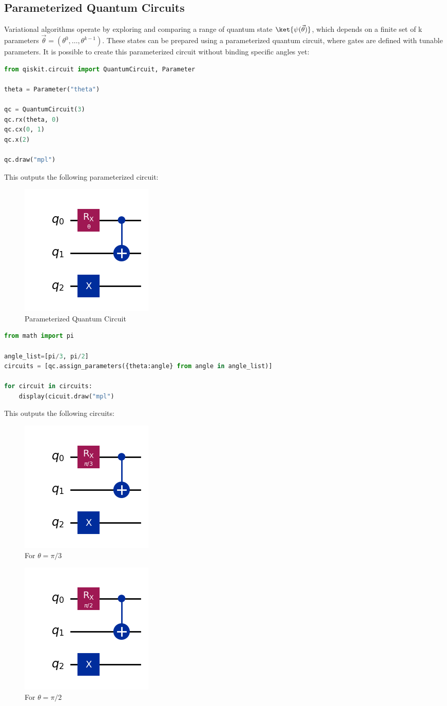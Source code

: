 \documentclass[12pt, oneside]{book}
\theoremstyle{definition}
\theoremstyle{definition}
\theoremstyle{remark}
\begin{document}
\subsection{Parameterized Quantum Circuits}
Variational algorithms operate by exploring and comparing a range of quantum state $\ket{\psi(\vec{\theta})}$, which depends on a finite set of k parameters $\vec{\theta}=(\theta^0,\ldots,\theta^{k-1})$. These states can be prepared using a parameterized quantum circuit, where gates are defined with tunable parameters. It is possible to create this parameterized circuit without binding specific angles yet:
\begin{lstlisting}[language=Python]
from qiskit.circuit import QuantumCircuit, Parameter

theta = Parameter("theta")

qc = QuantumCircuit(3)
qc.rx(theta, 0)
qc.cx(0, 1)
qc.x(2)

qc.draw("mpl")
\end{lstlisting}
This outputs the following parameterized circuit:
\begin{figure}[H]
    \centering
    \includegraphics[width=0.25\linewidth]{../images/param_qc.png}
    \caption{Parameterized Quantum Circuit}
    \label{fig:param_qc}
\end{figure}
\begin{lstlisting}[language=Python]
from math import pi

angle_list=[pi/3, pi/2]
circuits = [qc.assign_parameters({theta:angle} from angle in angle_list)]

for circuit in circuits:
    display(cicuit.draw("mpl")
\end{lstlisting}
This outputs the following circuits:
\begin{figure}[H]
    \centering
    \includegraphics[width=0.25\linewidth]{../images/param_ex1.png}
    \caption{For $\theta=\pi / 3$}
    \label{fig:param_ex1}
\end{figure}
\begin{figure}[H]
    \centering
    \includegraphics[width=0.25\linewidth]{../images/param_ex2.png}
    \caption{For $\theta = \pi/2 $}
    \label{fig:param_ex2}
\end{figure}
\end{document}

